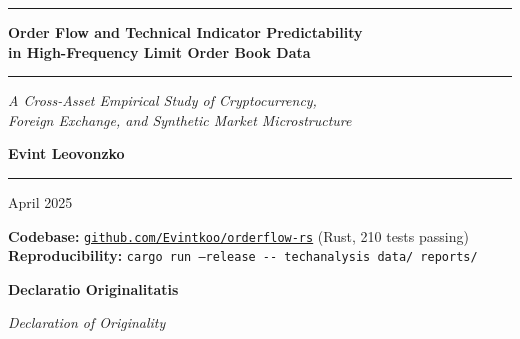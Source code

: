 \documentclass[12pt,a4paper]{article}
\theoremstyle{definition}
\theoremstyle{remark}
\newcommand{\code}[1]{\texttt{\small #1}}
\begin{document}

\begin{titlepage}
\centering
\vspace*{1.2cm}

{\color{darkblue}\rule{\linewidth}{3pt}}
\vspace{0.8cm}

{\LARGE\bfseries\color{darkblue}
Order Flow and Technical Indicator Predictability\\[0.4cm]
in High-Frequency Limit Order Book Data}

\vspace{0.5cm}
{\color{medblue}\rule{0.6\linewidth}{1pt}}
\vspace{0.5cm}

{\large\itshape\color{gray1}
A Cross-Asset Empirical Study of Cryptocurrency,\\
Foreign Exchange, and Synthetic Market Microstructure}

\vspace{1.8cm}

{\large\bfseries Evint Leovonzko}

\vspace{1.0cm}
{\color{medblue}\rule{0.4\linewidth}{0.5pt}}
\vspace{0.6cm}

{\normalsize April 2025}

\vfill
\begin{tcolorbox}[
  enhanced,
  colback=rowgray,
  colframe=gray1!50,
  arc=3pt,
  boxrule=0.4pt,
  width=0.90\linewidth,
  center,
]
\small\color{gray1}
\textbf{Codebase:}
\href{https://github.com/Evintkoo/orderflow-rs}{\texttt{github.com/Evintkoo/orderflow-rs}}
(Rust, 210 tests passing)
\quad\textbullet\quad
\textbf{Reproducibility:} \code{cargo run --release -{}- techanalysis data/ reports/}
\end{tcolorbox}
\end{titlepage}

\thispagestyle{empty}
\vspace*{2cm}

{\large\bfseries\color{darkblue} Declaratio Originalitatis}

\vspace{0.15cm}
{\small\itshape\color{gray1} Declaration of Originality}
\end{document}
